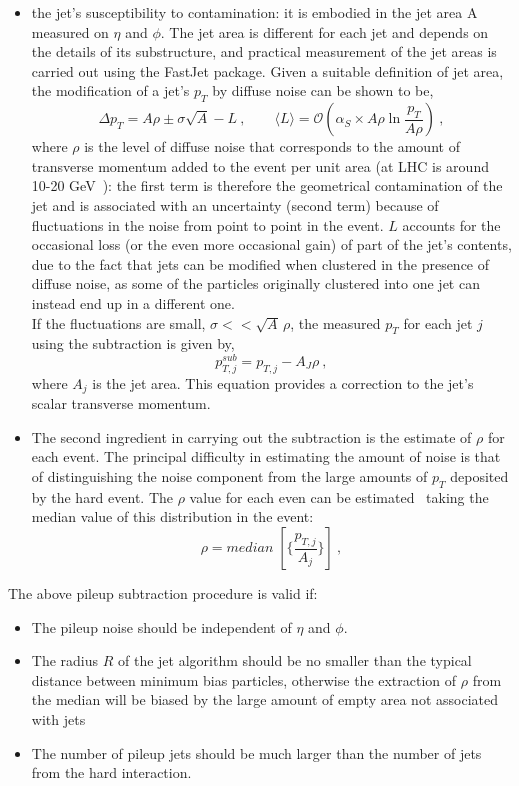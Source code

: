 \begin{itemize}
\item the jet’s susceptibility to contamination: it is embodied in the jet area A measured on $\eta$ and $\phi$. The jet area is different for each jet and depends on the details of its substructure, and practical measurement of the jet areas is carried out using the FastJet package. 
Given a suitable definition of jet area, the modification of a jet’s $p_T$ by diffuse noise can be shown to be,
\begin{equation} 
\Delta p_T=A\rho \pm \sigma \sqrt{A} -L \:, \qquad \langle L \rangle=\mathcal{O}(\alpha_S \times A \rho \ln \frac{p_T}{ A \rho}) \:,  
\end{equation} 
where $\rho$ is the level of diffuse noise that  corresponds to the amount of transverse momentum added to the event per unit area (at LHC is around 
10-20 GeV~\cite{Sjostrand:2003wg}): the first term is therefore the geometrical contamination of the jet 
and is associated with an uncertainty (second term) because of fluctuations in the noise from point to point in the event.
$L$  accounts for the occasional loss (or the even more occasional gain) of part of the jet’s contents,
due to the fact that jets can be modified when clustered in the presence of diffuse noise, as some
of the particles originally clustered into one jet can instead end up in a different one. \\
If the fluctuations are small, $\sigma << \sqrt{A} \, \rho$, the measured $p_T$ for each jet $j$ using the subtraction is given by,
\begin{equation} 
p_{T,j}^{sub}=p_{T,j} -A_J \rho \: ,
\end{equation} 
where $A_j $ is the jet area. This equation provides a correction to the jet’s scalar transverse
momentum.
\item The second ingredient in carrying out the subtraction is the estimate of $\rho$ for each event.
The principal difficulty in estimating the amount of noise is that of distinguishing the noise component from the large amounts of $p_T$ deposited by the hard event.
The $\rho$ value  for each even can be estimated~\cite{Cacciari:2007fd}  taking the median value of this distribution in the event: 
\begin{equation} 
\rho= median \; [\{\frac{p_{T,j}}{A_j}\}]  \: ,
\end{equation} 
\end{itemize}
The above pileup subtraction procedure is valid if: 
\begin{itemize}
\item The pileup noise should be independent of $\eta$ and $\phi$.
\item The radius $R$ of the jet algorithm should be no smaller than the typical distance between minimum bias particles, otherwise the extraction of
 $\rho$ from the median will be biased by the large amount of empty area not associated with jets
\item The number of pileup jets should be much larger than the number of jets from the hard interaction. 
\end{itemize}



